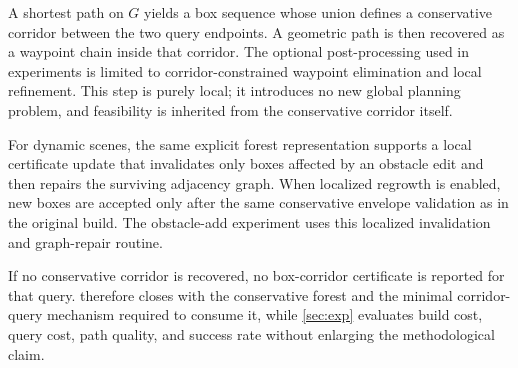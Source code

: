 \documentclass[journal]{IEEEtran}
\DeclareRobustCommand{\textsc}[1]{\textnormal{\MakeUppercase{#1}}}
\newcommand{\calO}{\ensuremath{\mathcal{O}}}
\begin{document}
A shortest path on $G$ yields a box sequence whose union defines a conservative
corridor between the two query endpoints. A geometric path is then recovered as
a waypoint chain inside that corridor. The optional post-processing used in
experiments is limited to corridor-constrained waypoint elimination and local
refinement. This step is purely local; it introduces no new global planning
problem, and feasibility is inherited from the conservative corridor itself.

For dynamic scenes, the same explicit forest representation supports a local
certificate update that invalidates only boxes affected by an obstacle edit and
then repairs the surviving adjacency graph. When localized regrowth is enabled,
new boxes are accepted only after the same conservative envelope validation as
in the original build. The obstacle-add experiment uses this localized
invalidation and graph-repair routine.


If no conservative corridor is recovered, no box-corridor certificate is
reported for that query.  therefore closes with the
conservative forest and the minimal corridor-query mechanism required to
consume it, while \cref{sec:exp} evaluates build cost, query cost, path
quality, and success rate without enlarging the methodological claim.
\end{document}
